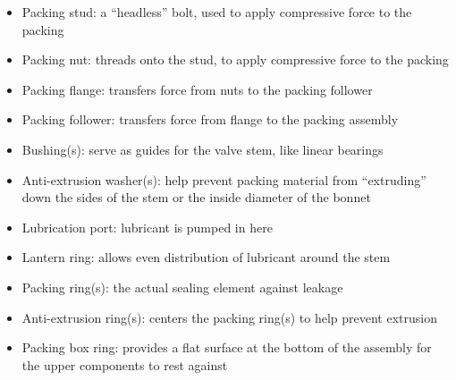 \begin{itemize}
\item{} Packing stud: a ``headless'' bolt, used to apply compressive force to the packing
\item{} Packing nut: threads onto the stud, to apply compressive force to the packing
\item{} Packing flange: transfers force from nuts to the packing follower
\item{} Packing follower: transfers force from flange to the packing assembly
\item{} Bushing(s): serve as guides for the valve stem, like linear bearings
\item{} Anti-extrusion washer(s): help prevent packing material from ``extruding'' down the sides of the stem or the inside diameter of the bonnet
\item{} Lubrication port: lubricant is pumped in here
\item{} Lantern ring: allows even distribution of lubricant around the stem
\item{} Packing ring(s): the actual sealing element against leakage
\item{} Anti-extrusion ring(s): centers the packing ring(s) to help prevent extrusion
\item{} Packing box ring: provides a flat surface at the bottom of the assembly for the upper components to rest against
\end{itemize}





